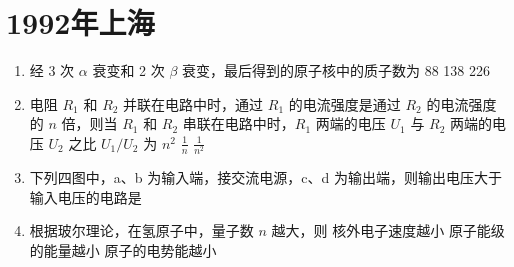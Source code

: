 \documentclass[\gkver]{gaokaozhenti}
\begin{document}
\chapter{1992年上海}

\begin{enumerate}
\item
 经 3 次 $\alpha$ 衰变和 2 次 $\beta$ 衰变，最后得到的原子核中的质子数为
{88}
{138}
{226}


\item
电阻 $R_{1}$ 和 $R_{2}$ 并联在电路中时，通过 $R_{1}$ 的电流强度是通过 $R_{2}$ 的电流强度的 $n$ 倍，则当 $R_{1}$ 和 $R_{2}$ 串联在电路中时，$R_{1}$ 两端的电压 $U_{1}$ 与 $R_{2}$ 两端的电压 $U_{2}$ 之比 $U_{1}/U_{2}$ 为
{$n^{2}$}
{$\frac{1}{n}$}
{$\frac{1}{n^{2}}$}


\item
下列四图中，a、b 为输入端，接交流电源，c、d 为输出端，则输出电压大于输入电压的电路是
\fourchoices[answer=C, ispicture=true, hA=2.20cm, hB=2.20cm, hC=2.20cm, hD=2.20cm]
{}
{}
{}
{}


\item
根据玻尔理论，在氢原子中，量子数 $n$ 越大，则
{核外电子速度越小}
{原子能级的能量越小}
{原子的电势能越小}


\end{enumerate}
\end{document}
